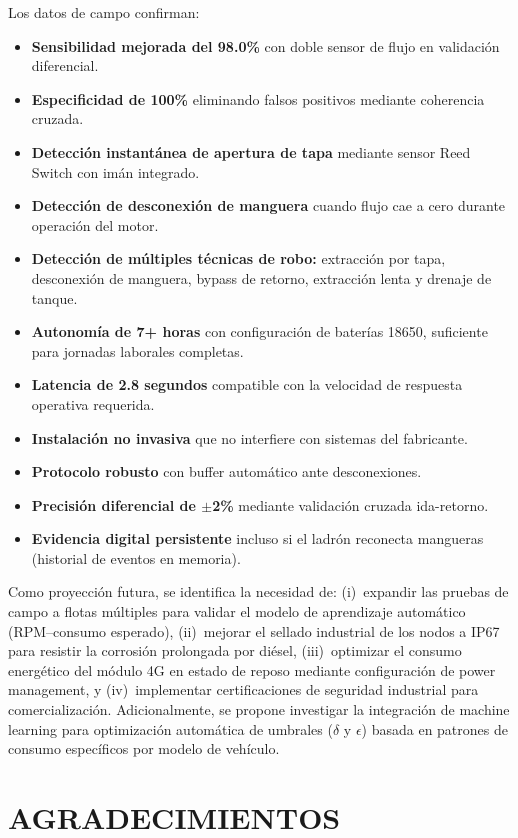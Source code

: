 \documentclass[twocolumn, 10pt]{article}
\begin{document}
Los datos de campo confirman:
\begin{itemize}
  \item \textbf{Sensibilidad mejorada del 98.0\%} con doble sensor de flujo en validación diferencial.
  \item \textbf{Especificidad de 100\%} eliminando falsos positivos mediante coherencia cruzada.
  \item \textbf{Detección instantánea de apertura de tapa} mediante sensor Reed Switch con imán integrado.
  \item \textbf{Detección de desconexión de manguera} cuando flujo cae a cero durante operación del motor.
  \item \textbf{Detección de múltiples técnicas de robo:} extracción por tapa, desconexión de manguera, bypass de retorno, extracción lenta y drenaje de tanque.
  \item \textbf{Autonomía de 7+ horas} con configuración de baterías 18650, suficiente para jornadas laborales completas.
  \item \textbf{Latencia de 2.8 segundos} compatible con la velocidad de respuesta operativa requerida.
  \item \textbf{Instalación no invasiva} que no interfiere con sistemas del fabricante.
  \item \textbf{Protocolo robusto} con buffer automático ante desconexiones.
  \item \textbf{Precisión diferencial de $\pm$2\%} mediante validación cruzada ida-retorno.
  \item \textbf{Evidencia digital persistente} incluso si el ladrón reconecta mangueras (historial de eventos en memoria).
\end{itemize}

Como proyección futura, se identifica la necesidad de: (i)~expandir las pruebas de campo a flotas múltiples para validar el modelo de aprendizaje automático (RPM--consumo esperado), (ii)~mejorar el sellado industrial de los nodos a IP67 para resistir la corrosión prolongada por diésel, (iii)~optimizar el consumo energético del módulo 4G en estado de reposo mediante configuración de power management, y (iv)~implementar certificaciones de seguridad industrial para comercialización. Adicionalmente, se propone investigar la integración de machine learning para optimización automática de umbrales ($\delta$ y $\epsilon$) basada en patrones de consumo específicos por modelo de vehículo.

\section*{AGRADECIMIENTOS}
\end{document}
